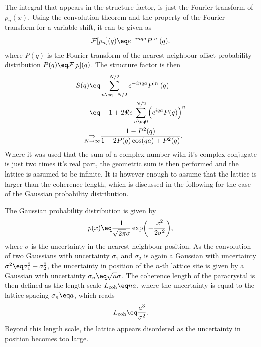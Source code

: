 \documentclass[\main/dresen_thesis.tex]{subfiles}
\begin{document}
The integral that appears in the structure factor, is just the Fourier transform of $p_n(x)$.
Using the convolution theorem and the property of the Fourier transform for a variable shift, it can be given as
\begin{align}
  \mathcal{F} [p_n](q) \eq e^{-inqa} P^{|n|}(q).
\end{align}
where $P(q)$ is the Fourier transform of the nearest neighbour offset probability distribution $P(q) \eq \mathcal{F} [p](q)$.
The structure factor is then
\begin{align}\begin{split}
  S(q) \eq& \sum_{n\eq -N/2}^{N/2} e^{-inqa} P^{|n|}(q)\\
  \eq& -1 + 2\Re e\sum_{n\eq 0}^{N/2} \Bigl(e^{iqa} P(q) \Bigr)^n\\
  \underset{N \rightarrow \infty}{\Rightarrow}& \frac{1 - P^2(q)}{1 - 2 P(q) \cos(qa) + P^2(q)}.\label{eq:appendix:calculations:paracrystal:StructureFactor}
\end{split}\end{align}
Where it was used that the sum of a complex number with it's complex conjugate is just two times it's real part, the geometric sum is then performed and the lattice is assumed to be infinite.
It is however enough to assume that the lattice is larger than the coherence length, which is discussed in the following for the case of the Gaussian probability distribution.

The Gaussian probability distribution is given by
\begin{align}
  p(x) \eq \frac{1}{\sqrt{2 \pi} \sigma} \exp \biggl( - \frac{x^2}{2 \sigma^2}\biggr),
\end{align}
where $\sigma$ is the uncertainty in the nearest neighbour position.
As the convolution of two Gaussians with uncertainty $\sigma_1$ and $\sigma_2$ is again a Gaussian with uncertainty $\sigma^2 \eq \sigma_1^2 + \sigma_2^2$, the uncertainty in position of the $n$-th lattice site is given by a Gaussian with uncertainty $\sigma_n \eq \sqrt{n} \sigma$.
The coherence length of the paracrystal is then defined as the length scale $L_\mathrm{coh} \eq n a$, where the uncertainty is equal to the lattice spacing $\sigma_n \eq a$, which reads
\begin{align}
  L_\mathrm{coh} \eq \frac{a^3}{\sigma^2}.\label{eq:appendix:calculations:paracrystal:CoherenceLength}
\end{align}
Beyond this length scale, the lattice appears disordered as the uncertainty in position becomes too large.
\end{document}
